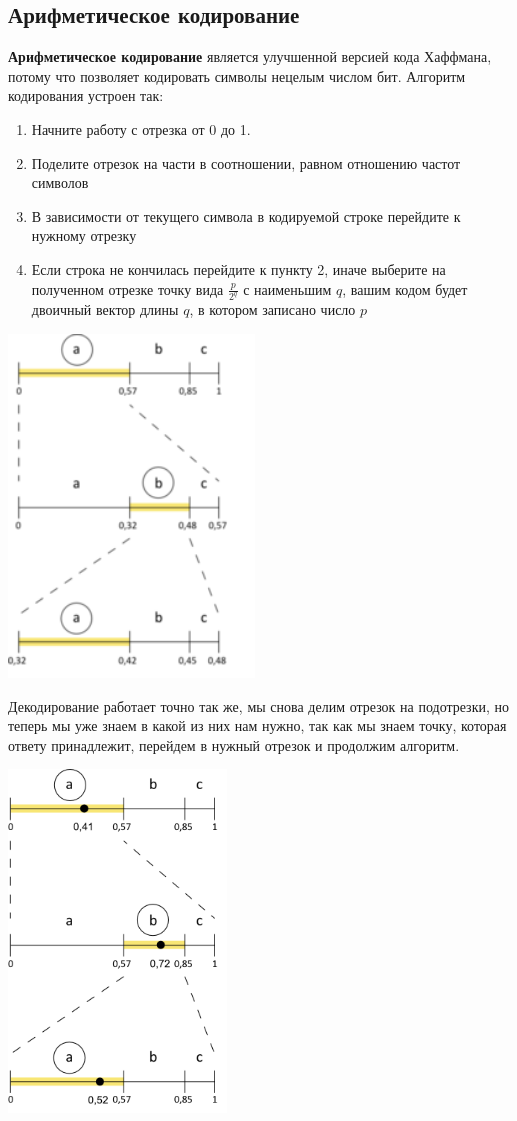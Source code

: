 
\subsection{Арифметическое кодирование}
\textbf{Арифметическое кодирование} является улучшенной версией кода Хаффмана, потому что позволяет кодировать символы нецелым числом бит. Алгоритм кодирования устроен так:
\begin{enumerate}
    \item Начните работу с отрезка от 0 до 1.
    \item Поделите отрезок на части в соотношении, равном отношению частот символов
    \item В зависимости от текущего символа в кодируемой строке перейдите к нужному отрезку
    \item Если строка не кончилась перейдите к пункту 2, иначе выберите на полученном отрезке точку вида $\frac{p}{2^q}$ с наименьшим $q$, вашим кодом будет двоичный вектор длины $q$, в котором записано число $p$
\end{enumerate}
\begin{center}
  \includegraphics[height=9.1cm]{assets/arif1.png}
\end{center}
Декодирование работает точно так же, мы снова делим отрезок на подотрезки, но теперь мы уже знаем в какой из них нам нужно, так как мы знаем точку, которая ответу принадлежит, перейдем в нужный отрезок и продолжим алгоритм.
\begin{center}
  \includegraphics[height=9.1cm]{assets/arif2.png}
\end{center}
